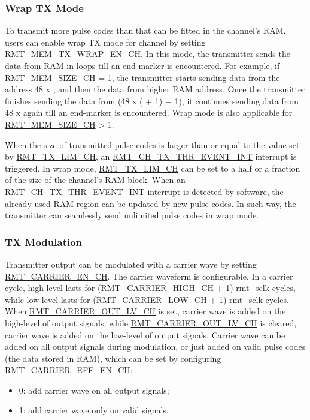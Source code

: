 \documentclass[main\_\_EN.tex]{subfiles}
\begin{document}
\subsubsection{Wrap TX Mode}\label{sec:wrap-tx-mode}

To transmit more pulse codes than that can be fitted in the channel's RAM, users can enable wrap TX mode for channel  by setting \hyperref[fielddesc:RMTMEMTXWRAPENCHN]{RMT\_MEM\_TX\_WRAP\_EN\_CH}. In this mode, the transmitter sends the data from RAM in loops till an end-marker is encountered.
For example, if \hyperref[fielddesc:RMTMEMSIZECHN]{RMT\_MEM\_SIZE\_CH} = 1, the transmitter starts sending data from the address 48 x , and then the data from higher RAM address. Once the transmitter finishes sending the data from (48 x ( $+$ 1) $-$ 1), it continues sending data from 48 x  again till an end-marker is encountered. Wrap mode is also applicable for \hyperref[fielddesc:RMTMEMSIZECHN]{RMT\_MEM\_SIZE\_CH} > 1.

When the size of transmitted pulse codes is larger than or equal to the value set by  \hyperref[fielddesc:RMTTXLIMCHN]{RMT\_TX\_LIM\_CH}, an \hyperref[int:RMTCHnTXTHREVENTINT]{RMT\_CH\_TX\_THR\_EVENT\_INT} interrupt is triggered. In wrap mode,  \hyperref[fielddesc:RMTTXLIMCHN]{RMT\_TX\_LIM\_CH} can be set to a half or a fraction of the size of the channel's RAM block. When an  \hyperref[int:RMTCHnTXTHREVENTINT]{RMT\_CH\_TX\_THR\_EVENT\_INT} interrupt is detected by software, the already used RAM region can be updated by new pulse codes. In such way, the transmitter can seamlessly send unlimited pulse codes in wrap mode.


\subsubsection{TX Modulation}

Transmitter output can be modulated with a carrier wave by setting  \hyperref[fielddesc:RMTCARRIERENCHN]{RMT\_CARRIER\_EN\_CH}. The carrier waveform is configurable. 
In a carrier cycle, high level lasts for (\hyperref[fielddesc:RMTCARRIERHIGHCHN]{RMT\_CARRIER\_HIGH\_CH} $+$ 1) rmt\_sclk cycles, while low level lasts for (\hyperref[fielddesc:RMTCARRIERLOWCHN]{RMT\_CARRIER\_LOW\_CH} $+$ 1) rmt\_sclk cycles. When  \hyperref[fielddesc:RMTCARRIEROUTLVCHN]{RMT\_CARRIER\_OUT\_LV\_CH} is set, carrier wave is added on the high-level of output signals; while  \hyperref[fielddesc:RMTCARRIEROUTLVCHN]{RMT\_CARRIER\_OUT\_LV\_CH} is cleared, carrier wave is added on the low-level of output signals. 
Carrier wave can be added on all output signals during modulation, or just added on valid pulse codes (the data stored in RAM), which can be set by configuring \hyperref[fielddesc:RMTCARRIEREFFENCHN]{RMT\_CARRIER\_EFF\_EN\_CH}: 
\begin{itemize}
    \item 0: add carrier wave on all output signals;
    \item 1: add carrier wave only on valid signals.
\end{itemize}
\end{document}
